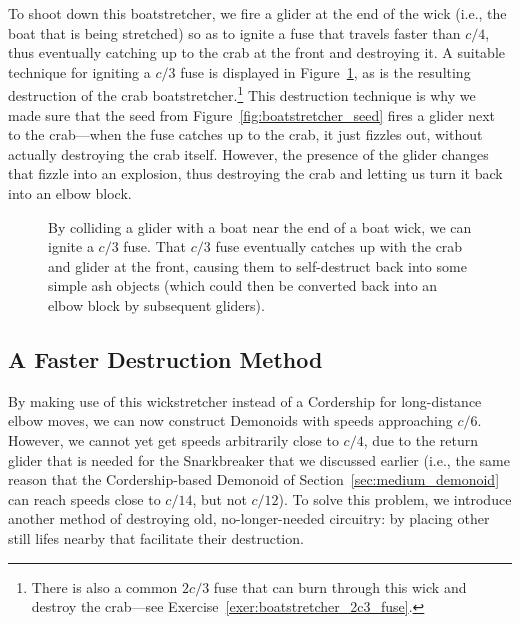 To shoot down this boatstretcher, we fire a glider at the end of the wick (i.e., the boat that is being stretched) so as to ignite a fuse that travels faster than $c/4$, thus eventually catching up to the crab at the front and destroying it. A suitable technique for igniting a $c/3$ fuse is displayed in Figure~\ref{fig:boatstretcher_shoot_down}, as is the resulting destruction of the crab boatstretcher.\footnote{There is also a common $2c/3$ fuse that can burn through this wick and destroy the crab---see Exercise~\ref{exer:boatstretcher_2c3_fuse}.} This destruction technique is why we made sure that the seed from Figure~\ref{fig:boatstretcher_seed} fires a glider next to the crab---when the fuse catches up to the crab, it just fizzles out, without actually destroying the crab itself. However, the presence of the glider changes that fizzle into an explosion, thus destroying the crab and letting us turn it back into an elbow block.

\begin{figure}[!htb]
	\centering
	
	\caption{By colliding a glider with a boat near the end of a boat wick, we can ignite a $c/3$ fuse. That $c/3$ fuse eventually catches up with the crab and glider at the front, causing them to self-destruct back into some simple ash objects (which could then be converted back into an elbow block by subsequent gliders).}\label{fig:boatstretcher_shoot_down}
\end{figure}


\subsection{A Faster Destruction Method}\label{sec:fast_demonoid_faster_destruction}

By making use of this wickstretcher instead of a Cordership for long-distance elbow moves, we can now construct Demonoids with speeds approaching $c/6$. However, we cannot yet get speeds arbitrarily close to $c/4$, due to the return glider that is needed for the Snarkbreaker that we discussed earlier (i.e., the same reason that the Cordership-based Demonoid of Section~\ref{sec:medium_demonoid} can reach speeds close to $c/14$, but not $c/12$). To solve this problem, we introduce another method of destroying old, no-longer-needed circuitry: by placing other still lifes nearby that facilitate their destruction.

